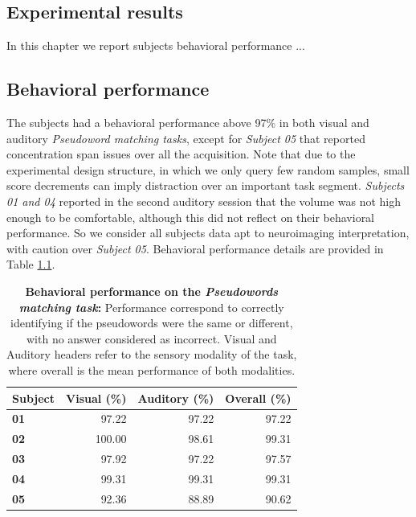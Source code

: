 \begin{fullwidth}
\chapter{\label{ch:super_syllables}
Experimental results}
\end{fullwidth}

\begin{chabstract}

In this chapter we report subjects behavioral performance ...

\end{chabstract}


\section{Behavioral performance}
%
The subjects had a behavioral performance above 97\% in both visual and auditory \emph{Pseudoword matching tasks}, except for \emph{Subject 05} that reported concentration span issues over all the acquisition.
Note that due to the experimental design structure, in which we only query few random samples, small score decrements can imply distraction over an important task segment.
\emph{Subjects 01 and 04} reported in the second auditory session that the volume was not high enough to be comfortable, although this did not reflect on their behavioral performance.
So we consider all subjects data apt to neuroimaging interpretation, with caution over \emph{Subject 05}. Behavioral performance details are provided in Table \ref{table:behavior}.


\begin{table}
\begin{tabular}{|>{\bfseries}l|rrr|}
\toprule
Subject &  Visual (\%) &  Auditory (\%) &  Overall (\%) \\
\midrule
01 &        97.22 &          97.22 &    97.22 \\
02 &       100.00 &          98.61 &    99.31 \\
03 &        97.92 &          97.22 &    97.57 \\
04 &        99.31 &          99.31 &    99.31 \\
05 &        92.36 &          88.89 &    90.62 \\
\bottomrule
\end{tabular}
\caption{\textbf{Behavioral performance on the \emph{Pseudowords matching task}:} Performance correspond to correctly identifying if the pseudowords were the same or different, with no answer considered as incorrect. Visual and Auditory headers refer to the sensory modality of the task, where overall is the mean performance of both modalities.}
\label{table:behavior}
\end{table}


